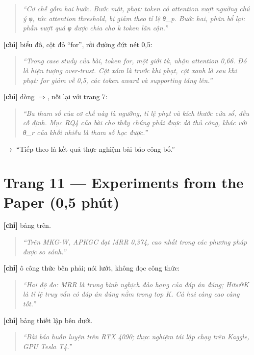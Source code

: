 \documentclass[11pt,a4paper]{article}
\begin{document}
\begin{quote}\itshape ``Cơ chế gồm hai bước. Bước một, phạt: token có attention vượt ngưỡng chú ý φ, tức attention threshold, bị giảm theo tỉ lệ θ\_p. Bước hai, phân bổ lại: phần vượt quá φ được chia cho k token lân cận.''\end{quote}

\textbf{[chỉ]} biểu đồ, cột đỏ ``for'', rồi đường đứt nét 0,5:


\begin{quote}\itshape ``Trong case study của bài, token \emph{for}, một giới từ, nhận attention 0,66. Đó là hiện tượng over-trust. Cột xám là trước khi phạt, cột xanh là sau khi phạt: \emph{for} giảm về 0,5, các token \emph{award} và \emph{supporting} tăng lên.''\end{quote}

\textbf{[chỉ]} dòng \ensuremath{\Rightarrow}, nối lại với trang 7:


\begin{quote}\itshape ``Ba tham số của cơ chế này là ngưỡng, tỉ lệ phạt và kích thước cửa sổ, đều \emph{cố định}. Mục RQ4 của bài cho thấy chúng phải được dò thủ công, khác với θ\_r của khối nhiễu là tham số học được.''\end{quote}

\textbf{$\to$} ``Tiếp theo là kết quả thực nghiệm bài báo công bố.''


\section*{Trang 11 --- Experiments from the Paper (0,5 phút)}

\textbf{[chỉ]} bảng trên.


\begin{quote}\itshape ``Trên MKG-W, APKGC đạt MRR 0,374, cao nhất trong các phương pháp được so sánh.''\end{quote}

\textbf{[chỉ]} ô công thức bên phải; nói lướt, không đọc công thức:


\begin{quote}\itshape ``Hai độ đo: MRR là trung bình nghịch đảo hạng của đáp án đúng; Hits@K là tỉ lệ truy vấn có đáp án đúng nằm trong top K. Cả hai càng cao càng tốt.''\end{quote}

\textbf{[chỉ]} bảng thiết lập bên dưới.


\begin{quote}\itshape ``Bài báo huấn luyện trên RTX 4090; thực nghiệm tái lập chạy trên Kaggle, GPU Tesla T4.''\end{quote}
\end{document}
